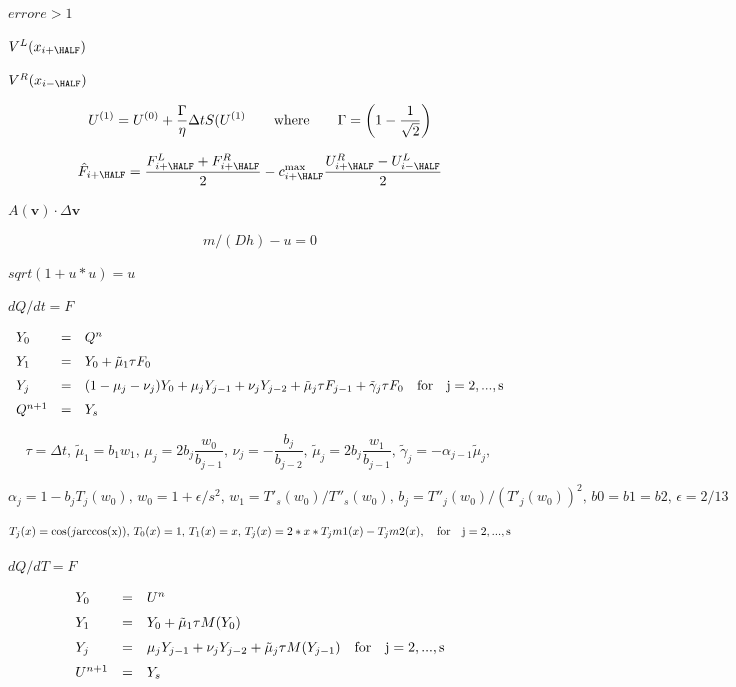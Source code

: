 \documentclass{article}
\begin{document}
$ errore > 1 $
\pagebreak

$ V^L(x_{i+\HALF}) $
\pagebreak

$ V^R(x_{i-\HALF}) $
\pagebreak

\[   U^{(1)} = U^{(0)} + \frac{\Gamma}{\eta}\Delta tS(U^{(1)}
   \qquad{\rm where}\qquad \Gamma = \left(1 - \frac{1}{\sqrt{2}}\right)
\]
\pagebreak

\[    \hat{F}_{i+\HALF} = \frac{F^L_{i+\HALF} + F^R_{i+\HALF}}{2}
 - c^{\rm max}_{i+\HALF}\frac{U^R_{i+\HALF} - U^L_{i-\HALF}}{2}
\]
\pagebreak

$ A(\mathbf{v})\cdot 
\Delta\mathbf{v} $
\pagebreak

\[   m/(Dh) - u = 0
\]
\pagebreak

$ sqrt(1+u*u) = u $
\pagebreak

$ dQ/dt = F$
\pagebreak

\[ \begin{array}{lcl}
     Y_0  & = & Q^n                       \\ \noalign{\medskip}
     Y_1  & = & Y_0 + \tilde{\mu}_1\tau F_0   \\ \noalign{\medskip}
     Y_j  & = & (1 - \mu_j - \nu_j) Y_0 + \mu_j Y_{j-1} + \nu_j Y_{j-2}
            + \tilde{\mu}_j \tau F_{j-1} + \tilde{\gamma}_j\tau F_0  
           \quad \rm{for} \quad j = 2,...,s    \\ \noalign{\medskip}
   Q^{n+1} & = & Y_s
     \end{array}
\]
\pagebreak

\[\tau = \Delta t,\, 
    \tilde{\mu}_1 = b_1 w_1,\,
    \mu_j = 2 b_j \frac{w_0}{b_{j-1}}, \,
    \nu_j = -\frac{b_j}{b_{j-2}},\,
    \tilde{\mu}_j = 2 b_j \frac{w_1}{b_{j-1}},\,
    \tilde{\gamma}_j = -\alpha_{j-1} \tilde{\mu}_j,\,
\]
\pagebreak

\[    \alpha_j = 1 - b_j T_j(w_0),\,
    w_0 = 1 + \epsilon/s^2,\,
    w_1 = T'_s(w_0)/T''_s(w_0),\,
    b_j = T''_j(w_0)/(T'_j(w_0))^2,\,
    b0=b1=b2,\,
    \epsilon = 2/13     
\]
\pagebreak

\[    T_j(x) = \cos(j {\rm arccos(x)})  ,\,
    T_0(x) = 1,\,
    T_1(x)=x,\,
    T_j(x)=2*x*T_jm1(x) - T_jm2(x), \quad \rm{for}\quad j = 2,...,s  
\]
\pagebreak

$ dQ/dT = F$
\pagebreak

\[ \begin{array}{lcl}
    Y_0 & = & U^n                            \\ \noalign{\medskip}
    Y_1 & = & Y_0 + \tilde{\mu}_1\tau M(Y_0) \\ \noalign{\medskip}
    Y_j & = & \mu_j Y_{j-1} + \nu_j Y_{j-2} + \tilde{\mu}_j \tau M(Y_{j-1}) 
          \quad \rm{for} \quad j = 2,...,s   \\ \noalign{\medskip}
    U^{n+1} & = & Y_s
    \end{array}
\]
\pagebreak
\end{document}
